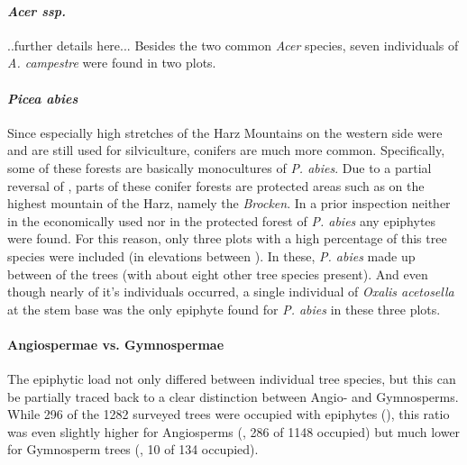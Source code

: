 \documentclass[12pt, a4paper, oneside, draft]{scrartcl}
\begin{document}
	
	
		\paragraph[Acer ssp.]{\textit{Acer ssp.}}
		..further details here... Besides the two common \textit{Acer} species, seven individuals of \textit{A. campestre} were found in two plots.
		
		\paragraph[Picea abies]{\textit{Picea abies}} Since especially high stretches of the Harz Mountains on the western side were and are still used for silviculture, conifers are much more common. Specifically, some of these forests are basically monocultures of \textit{P. abies}. Due to a partial reversal of ,  parts of these conifer forests are protected areas such as on the highest mountain of the Harz, namely the \emph{Brocken}. In a prior inspection neither in the economically used nor in the protected forest of \textit{P. abies} any epiphytes were found. For this reason, only three plots with a high percentage of this tree species were included (in elevations between ). In these, \textit{P. abies} made up between  of the trees (with about eight other tree species present). And even though nearly  of it's individuals occurred, a single individual of \textit{Oxalis acetosella} at the stem base was the only epiphyte found for \textit{P. abies} in these three plots. 
		
		\paragraph{Angiospermae vs. Gymnospermae}
		The epiphytic load not only differed between individual tree species, but this can be partially traced back to a clear distinction between Angio- and Gymnosperms. While 296 of the 1282 surveyed trees were occupied with epiphytes (), this ratio was even slightly higher for Angiosperms (, 286 of 1148 occupied) but much lower for Gymnosperm trees (, 10 of 134 occupied). 
		
	
\end{document}
